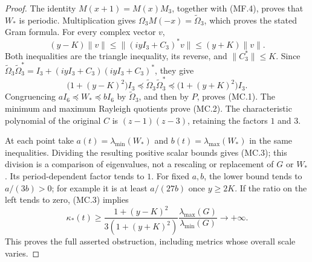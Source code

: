 \begin{proof}
The identity $M(x+1)=M(x)M_3$, together with (MF.4), proves that $W_*$
is periodic.  Multiplication gives
$\Omega_3M(-x)=\widetilde\Omega_3$, which proves the stated Gram formula.
For every complex vector $v$,
\[
 (y-K)\|v\|\leq\|(iyI_3+C_3)^*v\|\leq(y+K)\|v\|.
\]
Both inequalities are the triangle inequality, its reverse, and
$\|C_3^*\|\leq K$.  Since
$\widetilde\Omega_3\widetilde\Omega_3^*
=I_3+(iyI_3+C_3)(iyI_3+C_3)^*$, they give
\[
 \bigl(1+(y-K)^2\bigr)I_3
 \preceq\widetilde\Omega_3\widetilde\Omega_3^*
 \preceq\bigl(1+(y+K)^2\bigr)I_3.
\]
Congruencing $aI_6\preceq W_*\preceq bI_6$ by
$\widetilde\Omega_3$, and then by $P$, proves (MC.1).
The minimum and maximum Rayleigh quotients prove (MC.2).
The characteristic polynomial of the original $C$ is
$(z-1)(z-3)$, retaining the factors $1$ and $3$.

At each point take
$a(t)=\lambda_{\min}(W_*)$ and $b(t)=\lambda_{\max}(W_*)$ in the
same inequalities.  Dividing the resulting positive scalar bounds gives
(MC.3); this division is a comparison of eigenvalues, not a rescaling or
replacement of $G$ or $W_*$.  Its period-dependent factor tends to $1$.
For fixed $a,b$, the lower bound tends to $a/(3b)>0$; for example it is
at least $a/(27b)$ once $y\geq2K$.
If the ratio on the left tends to zero, (MC.3) implies
\[
 \kappa_*(t)\geq
 \frac{1+(y-K)^2}
 {3(1+(y+K)^2)}
 \frac{\lambda_{\max}(G)}{\lambda_{\min}(G)}
 \longrightarrow+\infty .
\]
This proves the full asserted obstruction, including metrics whose
overall scale varies.
\end{proof}

